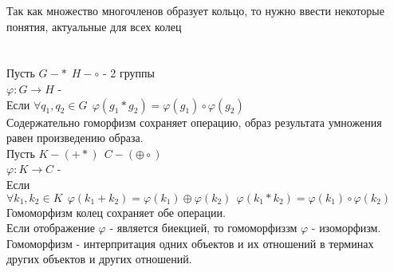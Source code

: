 Так как множество многочленов образует кольцо, то нужно ввести некоторые
понятия, актуальные для всех колец \\
 \\
 \\
Пусть $G - * ~~ H - \circ$ - 2 группы \\
$\varphi: G \to H$ -  \\
Если $\forall q_{1},q_{2} \in G ~~ \varphi(g_{1} * g_{2}) = \varphi(g_{1}) \circ
\varphi(g_{2})$ \\
Содержательно гоморфизм сохраняет операцию, образ результата умножения равен
произведению образа. \\

Пусть $K - (+*) ~~ C - (\oplus \circ)$ \\
$\varphi: K \to C$ -  \\
Если $\forall k_{1}, k_{2} \in K ~~ \varphi(k_{1} + k_{2}) = \varphi(k_{1})
\oplus \varphi(k_{2}) ~~ \varphi(k_{1} * k_{2}) = \varphi(k_{1}) \circ
\varphi(k_{2})$ \\
Гомоморфизм колец сохраняет обе операции. \\

Если отображение $\varphi$ - является биекцией, то гомоморфиззм $\varphi$ -
изоморфизм. \\

Гомоморфизм - интерпритация одних объектов и их отношений в терминах других
объектов и других отношений. \\
